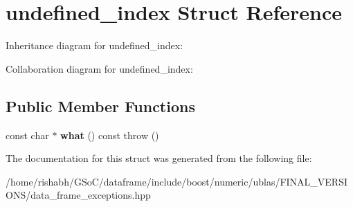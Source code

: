 \hypertarget{structundefined__index}{}\section{undefined\+\_\+index Struct Reference}
\label{structundefined__index}


Inheritance diagram for undefined\+\_\+index\+:


Collaboration diagram for undefined\+\_\+index\+:
\subsection*{Public Member Functions}
\begin{DoxyCompactItemize}
\item 
const char $\ast$ {\bfseries what} () const   throw ()\hypertarget{structundefined__index_ada38ff17daed9c3f0f03db03fab4c6a4}{}\label{structundefined__index_ada38ff17daed9c3f0f03db03fab4c6a4}

\end{DoxyCompactItemize}


The documentation for this struct was generated from the following file\+:\begin{DoxyCompactItemize}
\item 
/home/rishabh/\+G\+So\+C/dataframe/include/boost/numeric/ublas/\+F\+I\+N\+A\+L\+\_\+\+V\+E\+R\+S\+I\+O\+N\+S/data\+\_\+frame\+\_\+exceptions.\+hpp\end{DoxyCompactItemize}
